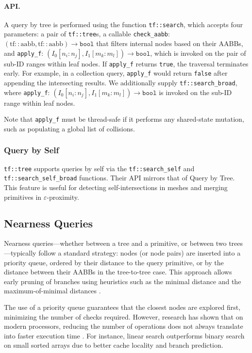 \paragraph*{API.}
A query by tree is performed using the function
\texttt{tf::search}, which accepts four parameters:
a pair of \texttt{tf::tree}s, a callable
\texttt{check\_aabb}: $(\mathrm{tf::aabb}, \mathrm{tf::aabb}) \to \texttt{bool}$
that filters internal nodes based on their AABBs,
and \texttt{apply\_f}: $(I_0[n_i:n_j], I_1[m_k:m_l]) \to \texttt{bool}$,
which is invoked on the pair of sub-ID ranges within leaf nodes.
If \texttt{apply\_f} returns \texttt{true}, the traversal
terminates early. For example, in a collection query,
\texttt{apply\_f} would return \texttt{false} after
appending the intersecting results. We additionally
supply \texttt{tf::search\_broad}, where
\texttt{apply\_f}: $(I_0[n_i:n_j], I_1[m_k:m_l]) \to \texttt{bool}$
is invoked on the sub-ID range within leaf nodes.

Note that \texttt{apply\_f} must be thread-safe if it performs
any shared-state mutation, such as populating a global list
of collisions.

\subsubsection{Query by Self}
\texttt{tf::tree} supports queries by self via the
\texttt{tf::search\_self} and 
\texttt{tf::search\_self\_broad} functions. Their API
mirrors that of Query by Tree.
This feature is useful for detecting self-intersections
in meshes and merging primitives in $\varepsilon$-proximity.



\subsection{Nearness Queries}

Nearness queries---whether between a tree and a
primitive, or between two trees---typically follow a
standard strategy: nodes (or node pairs) are inserted
into a priority queue, ordered by their distance to the
query primitive, or by the distance between their AABBs
in the tree-to-tree case. This approach allows early
pruning of branches using heuristics such as the minimal
distance and the maximum-of-minimal distances
\cite{knn0, eknn}.

The use of a priority queue guarantees that the closest
nodes are explored first, minimizing the number of checks
required. However, research has shown that on modern
processors, reducing the number of operations does not
always translate into faster execution time
\cite{alexandrescu-sorting}. For instance, linear search
outperforms binary search on small sorted arrays due to
better cache locality and branch prediction.

